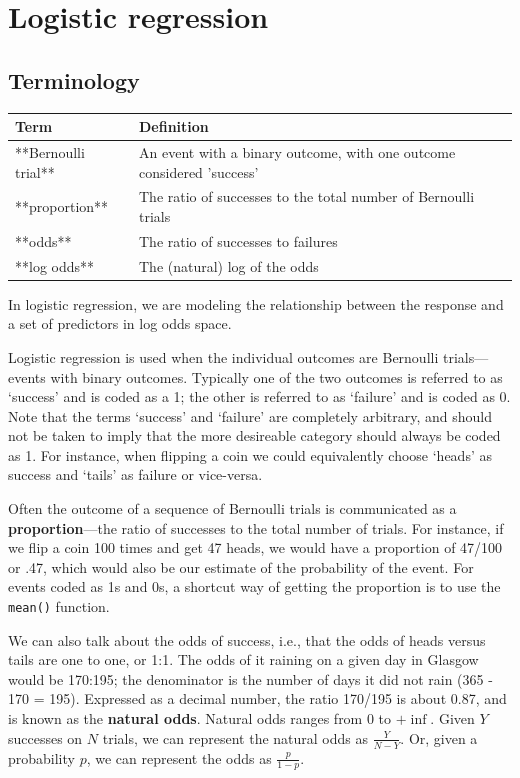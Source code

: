 \documentclass[]{book}
\begin{document}
\hypertarget{logistic-regression}{%
\section{Logistic regression}\label{logistic-regression}}

\hypertarget{terminology}{%
\subsection{Terminology}\label{terminology}}

\begin{tabular}{l|l}
\hline
Term & Definition\\
\hline
**Bernoulli trial** & An event with a binary outcome, with one outcome considered 'success'\\
\hline
**proportion** & The ratio of successes to the total number of Bernoulli trials\\
\hline
**odds** & The ratio of successes to failures\\
\hline
**log odds** & The (natural) log of the odds\\
\hline
\end{tabular}

In logistic regression, we are modeling the relationship between the response and a set of predictors in log odds space.

Logistic regression is used when the individual outcomes are Bernoulli trials---events with binary outcomes. Typically one of the two outcomes is referred to as `success' and is coded as a 1; the other is referred to as `failure' and is coded as 0. Note that the terms `success' and `failure' are completely arbitrary, and should not be taken to imply that the more desireable category should always be coded as 1. For instance, when flipping a coin we could equivalently choose `heads' as success and `tails' as failure or vice-versa.

Often the outcome of a sequence of Bernoulli trials is communicated as a \textbf{proportion}---the ratio of successes to the total number of trials. For instance, if we flip a coin 100 times and get 47 heads, we would have a proportion of 47/100 or .47, which would also be our estimate of the probability of the event. For events coded as 1s and 0s, a shortcut way of getting the proportion is to use the \texttt{mean()} function.

We can also talk about the odds of success, i.e., that the odds of heads versus tails are one to one, or 1:1. The odds of it raining on a given day in Glasgow would be 170:195; the denominator is the number of days it did not rain (365 - 170 = 195). Expressed as a decimal number, the ratio 170/195 is about 0.87, and is known as the \textbf{natural odds}. Natural odds ranges from 0 to \(+\inf\). Given \(Y\) successes on \(N\) trials, we can represent the natural odds as \(\frac{Y}{N - Y}\). Or, given a probability \(p\), we can represent the odds as \(\frac{p}{1-p}\).
\end{document}
